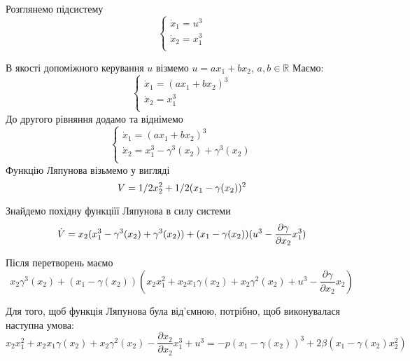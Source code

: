 \documentclass{article}
\begin{document}
Розглянемо підсистему
\begin{equation}
    \begin{cases}
    \dot x_1 = u^3\\
    \dot x_2 = x_{1}^3\\
    \end{cases}
\end{equation}

В якості допоміжного керування $u$ візмемо $u=ax_1+bx_2$, $a,b \in \mathbb{R}$
Маємо: 
\begin{equation}
    \begin{cases}
    \dot x_1 = (ax_1+bx_2)^3\\
    \dot x_2 = x_{1}^3\\
    \end{cases}
\end{equation}
До другого рівняння додамо та віднімемо 
\begin{equation}
    \begin{cases}
    \dot x_1 = (ax_1+bx_2)^3\\
    \dot x_2 = x_{1}^3 -\gamma^3(x_2)+\gamma^3(x_2)\\
    \end{cases}
\end{equation}
Функцію Ляпунова візьмемо у вигляді  
\begin{equation}
    V = 1/2x_{2}^2 + 1/2(x_1 - \gamma(x_2) )^2\\
\end{equation}

Знайдемо похідну функціїї Ляпунова в силу системи 
\begin{equation}
    \dot V = x_2(x_1^3 - \gamma^3(x_2)+\gamma^3(x_2)) + \\
    (x_1 - \gamma(x_2))(u^3-\frac{\partial \gamma}{\partial x_2}x_1^3)
\end{equation}

Після перетворень маємо
\begin{equation}
    x_2\gamma^3(x_2)+(x_1 - \gamma(x_2))
    (x_2x_1^2+x_2x_1\gamma(x_2)+x_2\gamma^2(x_2)+u^3- 
    \frac{\partial \gamma}{\partial x_2}x_2)
\end{equation}

Для того, щоб функція Ляпунова була від'ємною, потрібно, щоб
виконувалася наступна умова:
\begin{equation}
    x_2x_1^2+x_2x_1\gamma(x_2) + x_2 \gamma^2(x_2) - 
    \frac{\partial x_2}{\partial x_2}x_1^3 + u^3 = 
    -p(x_1-\gamma(x_2))^3 +2\beta(x_1-\gamma(x_2)x_{2}^2) 
\end{equation}
\end{document}
